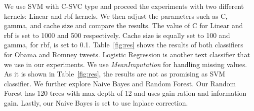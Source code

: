 \documentclass[letterpaper, 12pt]{article}
\begin{document}
We use SVM with C-SVC type and proceed the experiments with two different kernels: Linear and rbf 
kernels. We then adjust the parameters such as C, gamma, and cache size and compare the results. 
The value of C for Linear and rbf is set to 1000 and 500 respectively. Cache size is equally set 
to 100 and gamma, for rbf, is set to 0.1. Table~\ref{fig:res} shows the results of both 
classifiers for Obama and Romney tweets. Logistic Regression is another text classifier that we use in our experiments. We use \emph{MeanImputation}
for handling missing values. As it is shown in Table~\ref{fig:res}, the results are not as promising as
SVM classifier. We further explore Naive Bayes and Random Forest. Our Random Forest has 120 trees 
with max depth of 12 and uses gain ration and information gain. Lastly, our Naive Bayes is set to 
use laplace correction. 


\begin{table}[t]
        \centering
        \caption{Classification methods results}
        \label{fig:res}
        \end{table}
\end{document}
